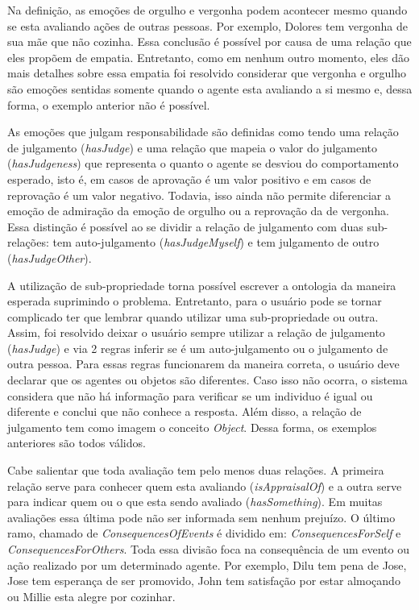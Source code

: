 Na definição, as emoções de orgulho e vergonha podem acontecer mesmo quando se
esta avaliando ações de outras pessoas. Por exemplo, Dolores tem vergonha de
sua mãe que não cozinha. Essa conclusão é possível por causa de uma relação
que eles propõem de empatia. Entretanto, como em nenhum outro momento, eles
dão mais detalhes sobre essa empatia foi resolvido considerar que vergonha e
orgulho são emoções sentidas somente quando o agente esta avaliando a si mesmo
e, dessa forma, o exemplo anterior não é possível. \dev{}

As emoções que julgam responsabilidade são definidas como tendo uma relação de
julgamento (\emph{hasJudge}) e uma relação que mapeia o valor do julgamento
(\emph{hasJudgeness}) que representa o quanto o agente se desviou do
comportamento esperado, isto é, em casos de aprovação é um valor positivo e em
casos de reprovação é um valor negativo. Todavia, isso ainda não permite
diferenciar a emoção de admiração da emoção de orgulho ou a reprovação da de
vergonha. Essa distinção é possível ao se dividir a relação de julgamento com
duas sub-relações: tem auto-julgamento (\emph{hasJudgeMyself}) e tem
julgamento de outro (\emph{hasJudgeOther}).

A utilização de sub-propriedade torna possível escrever a ontologia da maneira
esperada suprimindo o problema. Entretanto, para o usuário pode se tornar
complicado ter que lembrar quando utilizar uma sub-propriedade ou outra.
Assim, foi resolvido deixar o usuário sempre utilizar a relação de julgamento
(\emph{hasJudge}) e via 2 regras inferir se é um auto-julgamento ou o
julgamento de outra pessoa. Para essas regras funcionarem da maneira correta,
o usuário deve declarar que os agentes ou objetos são diferentes. Caso isso
não ocorra, o sistema considera que não há informação para verificar se um
individuo é igual ou diferente e conclui que não conhece a resposta. Além
disso, a relação de julgamento tem como imagem o conceito \emph{Object}. Dessa
forma, os exemplos anteriores são todos válidos.

Cabe salientar que toda avaliação tem pelo menos duas relações. A primeira
relação serve para conhecer quem esta avaliando (\emph{isAppraisalOf}) e a
outra serve para indicar quem ou o que esta sendo avaliado
(\emph{hasSomething}). Em muitas avaliações essa última pode não ser
informada sem nenhum prejuízo. O último ramo, chamado de
\emph{ConsequencesOfEvents} é dividido em: \emph{ConsequencesForSelf} e
\emph{ConsequencesForOthers}. Toda essa divisão foca na consequência de um
evento ou ação realizado por um determinado agente. Por exemplo, Dilu tem pena
de Jose, Jose tem esperança de ser promovido, John tem satisfação por
estar almoçando ou Millie esta alegre por cozinhar.

